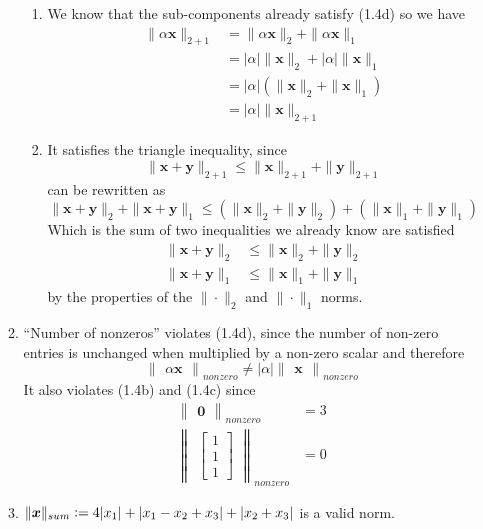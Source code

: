 \documentclass[]{article}
\newcommand{\bbm}{\begin{bmatrix}}
\newcommand{\ebm}{\end{bmatrix}}
\newcommand{\bnm}{\begin{Vmatrix}}
\newcommand{\enm}{\end{Vmatrix}}
\newcommand\nsum[1]{\| #1 \|_{sum}}
\newcommand{\defeq}{\vcentcolon=}
\begin{document}
\begin{enumerate}[resume]
\begin{enumerate}
\begin{enumerate}
    \item We know that the sub-components already satisfy (1.4d)
      so we have
      \[
      \begin{split}
        \| \alpha \bm{x} \|_{2 + 1} &= \|\alpha \bm{x} \|_2 + \|\alpha \bm{x} \|_1 \\
        &= |\alpha| \| \bm{x} \|_2 + |\alpha| \| \bm{x} \|_1 \\
        &= |\alpha| (\| \bm{x} \|_2 + \| \bm{x} \|_1) \\
        &= |\alpha| \| \bm{x} \|_{2 + 1}
      \end{split}
      \]
    \item
      It satisfies the triangle inequality, since
      \[
      \| \bm{x} + \bm{y}\|_{2 + 1} \leq \| \bm{x} \|_{2 + 1} + \| \bm{y}\|_{2 + 1}
      \]
      can be rewritten as
      \[
      \| \bm{x} + \bm{y}\|_{2} + \| \bm{x} + \bm{y}\|_{1} \leq (\| \bm{x} \|_{2} + \| \bm{y}\|_{2}) + (\| \bm{x} \|_{1} + \| \bm{y}\|_{1})
      \]
      Which is the sum of two inequalities we already know are satisfied
      \[
      \begin{split}
        \| \bm{x} + \bm{y}\|_{2} & \leq \| \bm{x} \|_{2} + \| \bm{y}\|_{2} \\
        \| \bm{x} + \bm{y}\|_{1} & \leq \| \bm{x} \|_{1} + \| \bm{y}\|_{1}
      \end{split}
      \]
      by the properties of the $\|\cdot\|_2$ and $\|\cdot\|_1$ norms.
    \end{enumerate}
    
  \item ``Number of nonzeros'' violates (1.4d), since the number
    of non-zero entries is unchanged when multiplied by a
    non-zero scalar and therefore
    \[
    \bnm \alpha \bm{x} \enm_{nonzero} \neq |\alpha|\bnm \bm{x} \enm_{nonzero}
    \]
    It also violates (1.4b) and (1.4c) since
    \[ \begin{split}
      \bnm \bm{0} \enm_{nonzero} &= 3 \\
      \bnm \bbm 1 \\ 1 \\ 1 \ebm \enm_{nonzero} &= 0
    \end{split} \]
    
  \item $\nsum{\bm{x}} \defeq 4|x_1| + |x_1 - x_2 + x_3| + |x_2 +
    x_3|$ is a valid norm.


\end{enumerate}
\end{enumerate}
\end{document}
